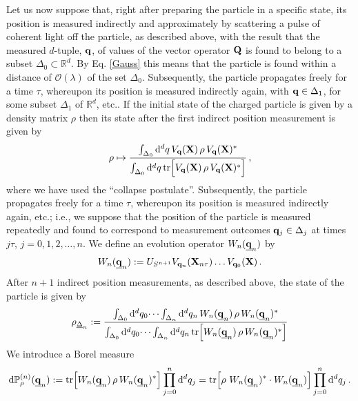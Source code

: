 \documentclass[11pt]{article}
\renewcommand{\d}{{\mathrm d}}
\begin{document}
Let us now suppose that, right after preparing the particle in a specific state, its position is measured indirectly and approximately by scattering a pulse of coherent light off the particle, as described above, with the result that the measured $d$-tuple, ${\bf{q}}$, of values of the vector operator ${\bf{Q}}$ is found to belong to a subset $\Delta_0 \subset \mathbb{R}^{d}$. By Eq. \eqref{Gauss} this means that the particle is found within a distance of $\mathcal{O}(\lambda)$ of the set $\Delta_0$. Subsequently, the particle propagates freely for a time $\tau$, whereupon its position is measured indirectly again, with ${\bf{q}} \in \Delta_1$, for some subset $\Delta_1$ of $\mathbb{R}^{d}$, etc.. If the initial state of the charged particle is given by a density matrix $\rho$ then its state after the first indirect position measurement is given by
\begin{equation}\label{collapse}
\rho \mapsto \frac{\int_{\Delta_0} \d^{d}{q}\, V_{{\bf{q}}}({\bf{X}}) \, \rho \, V_{{\bf{q}}}({\bf{X}})^{*}}{\int_{\Delta_0} 
\d^{d}{q}\, \text{tr}\Big[ V_{{\bf{q}}}({\bf{X}}) \, \rho \, V_{{\bf{q}}}({\bf{X}})^{*}\Big]} \,,
\end{equation}
where we have used the ``collapse postulate''.
Subsequently, the particle propagates freely for a time $\tau$, whereupon its position is measured indirectly again, etc.; i.e., 
we suppose that the position of the particle is measured repeatedly and found to correspond to measurement outcomes 
${\bf{q}}_j\in \Delta_j$ at times $j\tau$, $j=0, 1, 2, \dots, n$. We define an evolution operator $W_{n}(\underline{{\bf{q}}}_{n})$ by
\begin{equation}\label{history}
W_{n}(\underline{{\bf{q}}}_{n}):= U_{S^{n+1}}V_{{\bf{q}}_{n}}({\bf{X}}_{n\tau}) \dots V_{{\bf{q}}_{0}}({\bf{X}})\,.
\end{equation}
After $n+1$ indirect position measurements, as described above, the state of the particle is given by
\begin{equation}\label{measured state}
\rho_{\underline{\Delta}_n}:= \frac{\int_{\Delta_0} \d^{d}{q}_0 \dots \int_{\Delta_n} \d^{d}{q}_n \, W_{n}(\underline{{\bf{q}}}_{n})\, \rho\, W_{n}(\underline{{\bf{q}}}_{n})^{*}}{\int_{\Delta_0} \d^{d}{q}_0 \dots \int_{\Delta_n} 
\d^{d}{q}_n \, \text{tr}\Big[ 
W_{n}(\underline{{\bf{q}}}_{n})\, \rho\, W_{n}(\underline{{\bf{q}}}_{n})^{*} \Big]}
\end{equation}
 We introduce a Borel measure 
 \begin{equation}\label{prob measure}
 \d \mathbb{P}^{(n)}_{\rho}(\underline{{\bf{q}}}_{n}):= 
 \text{tr}\Big[ W_{n}(\underline{{\bf{q}}}_{n})\, \rho\, W_{n}(\underline{{\bf{q}}}_{n})^{*} \Big] \prod_{j=0}^{n} \d^{d}{q}_j = 
 \text{tr}\Big[  \rho\,\, W_{n}(\underline{{\bf{q}}}_{n})^{*} \cdot W_{n}(\underline{{\bf{q}}}_{n}) \Big] \prod_{j=0}^{n}
 \d^{d}{q}_j \,.
 \end{equation}
\end{document}
